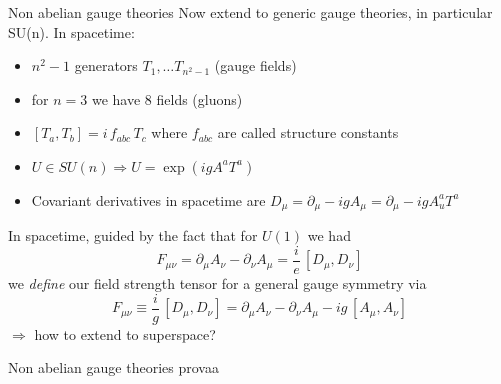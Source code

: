 \documentclass[10pt]{beamer}
\begin{document}
\begin{frame}{Non abelian gauge theories}
Now extend to generic gauge theories, in particular SU(n). In spacetime:
\begin{itemize}
    \item $n^2-1$ generators $T_{1}, \dots T_{n^2-1}$ (gauge fields)
    \item for $n=3$ we have 8 fields (gluons)
    \item $\left[T_a, T_b\right] = i \, f_{abc} \, T_c$ where $f_{abc}$ are called structure constants
    \item $U \in SU(n) \Rightarrow U = \exp(i g A^a T^a)$
    \item Covariant derivatives  in spacetime are $D_\mu = \partial_\mu - ig A_\mu = \partial_\mu - igA_u^a T^a$
\end{itemize}
In spacetime, guided by the fact that for $U(1)$ we had $$F_{\mu\nu} = \partial_\mu A_\nu - \partial_\nu A_\mu = \frac{i}{e} \, [D_\mu, D_\nu]$$
we \emph{define} our field strength tensor for a general gauge symmetry via 
\begin{equation*} 
    F_{\mu \nu} \equiv \frac{i}{g} \, [D_\mu, D_\nu] = \partial_\mu A_\nu - \partial_\nu A_\mu -ig \, [A_\mu, A_\nu]
\end{equation*}
$\Rightarrow$ how to extend to superspace?
\end{frame}

\begin{frame}{Non abelian gauge theories}
    provaa
\end{frame}

\begin{frame}
    \nocite{*}
    \printbibliography
\end{frame}
\end{document}
